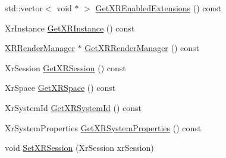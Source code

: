 \begin{DoxyCompactItemize}
\item 
std\+::vector$<$ void $\ast$ $>$ \mbox{\hyperlink{class_open_x_r_provider_1_1_x_r_provider_adcfd16c34593dd486444db07f5a6d6b8}{Get\+X\+R\+Enabled\+Extensions}} () const
\item 
Xr\+Instance \mbox{\hyperlink{class_open_x_r_provider_1_1_x_r_provider_a9e108c811e6fbb6ddd1e00e96c675fba}{Get\+X\+R\+Instance}} () const
\item 
\mbox{\hyperlink{class_open_x_r_provider_1_1_x_r_render_manager}{X\+R\+Render\+Manager}} $\ast$ \mbox{\hyperlink{class_open_x_r_provider_1_1_x_r_provider_a23af3c59dab3caab02728403adae13f4}{Get\+X\+R\+Render\+Manager}} () const
\item 
Xr\+Session \mbox{\hyperlink{class_open_x_r_provider_1_1_x_r_provider_adfd13c0c76ff0fec35674d343ba55c06}{Get\+X\+R\+Session}} () const
\item 
Xr\+Space \mbox{\hyperlink{class_open_x_r_provider_1_1_x_r_provider_a53db40884126aaa44f32953fa889fb76}{Get\+X\+R\+Space}} () const
\item 
Xr\+System\+Id \mbox{\hyperlink{class_open_x_r_provider_1_1_x_r_provider_a8b2a2dd1e3497a8395b496be5eff6f2c}{Get\+X\+R\+System\+Id}} () const
\item 
Xr\+System\+Properties \mbox{\hyperlink{class_open_x_r_provider_1_1_x_r_provider_a6a1d17df601888feeb5481fc1d49bae2}{Get\+X\+R\+System\+Properties}} () const
\item 
void \mbox{\hyperlink{class_open_x_r_provider_1_1_x_r_provider_a96ffa9e4f37cc4967cf41fce027e5234}{Set\+X\+R\+Session}} (Xr\+Session xr\+Session)
\end{DoxyCompactItemize}
